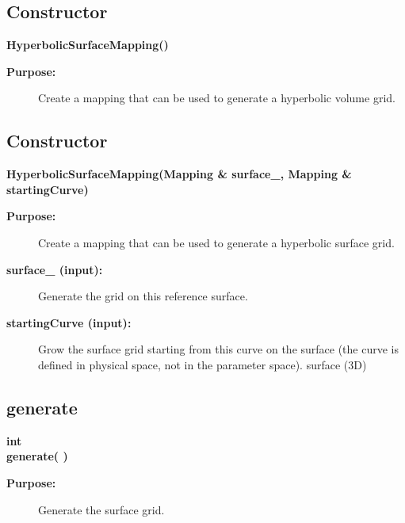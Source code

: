 \subsection{Constructor}
 
\newlength{\HyperbolicSurfaceMappingIncludeArgIndent}
\begin{flushleft} \textbf{%
\settowidth{\HyperbolicSurfaceMappingIncludeArgIndent}{HyperbolicSurfaceMapping(}%
HyperbolicSurfaceMapping() 
}\end{flushleft}
\begin{description}
\item[{\bf Purpose:}]  
    Create a mapping that can be used to generate a hyperbolic volume grid.
 
\end{description}
\subsection{Constructor}
 
\begin{flushleft} \textbf{%
\settowidth{\HyperbolicSurfaceMappingIncludeArgIndent}{HyperbolicSurfaceMapping(}%
HyperbolicSurfaceMapping(Mapping \& surface\_, Mapping \& startingCurve) 
}\end{flushleft}
\begin{description}
\item[{\bf Purpose:}]  
    Create a mapping that can be used to generate a hyperbolic surface grid.
\item[{\bf surface\_ (input):}]  Generate the grid on this reference surface.
\item[{\bf startingCurve (input):}]  Grow the surface grid starting from this curve on the
    surface (the curve is defined in physical space, not in the parameter space).
 surface (3D)
\end{description}
\subsection{generate}
 
\begin{flushleft} \textbf{%
int  \\ 
\settowidth{\HyperbolicSurfaceMappingIncludeArgIndent}{generate(}%
generate( )
}\end{flushleft}
\begin{description}
\item[{\bf Purpose:}]  
    Generate the surface grid.
\end{description}
